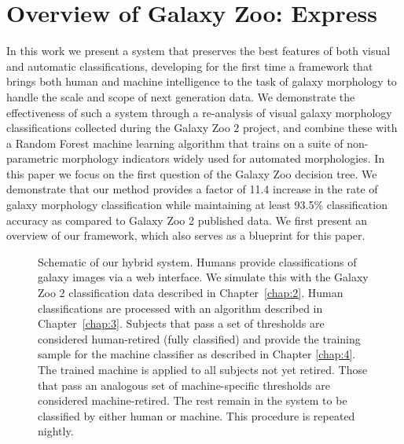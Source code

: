 \section{Overview of Galaxy Zoo: Express}

 In this work we present a system that preserves the best features of both visual and automatic classifications, developing for the first time a framework that brings both human and machine intelligence to the task of galaxy morphology to handle the scale and scope of next generation data. We demonstrate the effectiveness of such a system through a re-analysis of visual galaxy morphology classifications collected during the Galaxy Zoo 2 project, and combine these with a Random Forest machine learning algorithm that trains on a suite of non-parametric morphology indicators widely used for automated morphologies. In this paper we focus on the first question of the Galaxy Zoo decision tree. We demonstrate that our method provides a factor of 11.4 increase in the rate of galaxy morphology classification  while maintaining at least 93.5\% classification accuracy as compared to Galaxy Zoo 2 published data. We first present an overview of our framework, which also serves as a blueprint for this paper. 


\begin{figure}[ht!]
\caption[Schematic of the Galaxy Zoo: Express human+machine hybrid system.]{Schematic of our hybrid system. Humans provide classifications of galaxy images via a web interface. We simulate this with the Galaxy Zoo 2 classification data described in Chapter~\ref{chap:2}. Human classifications are processed with an algorithm described in Chapter~\ref{chap:3}. Subjects that pass a set of thresholds are considered human-retired (fully classified) and provide the training sample for the machine classifier as described in Chapter \ref{chap:4}. The trained machine is applied to all subjects not yet retired. Those that pass an analogous set of machine-specific thresholds are considered machine-retired. The rest remain in the system to be classified by either human or machine. This procedure is repeated  nightly. \label{fig: schematic}}
\end{figure}



